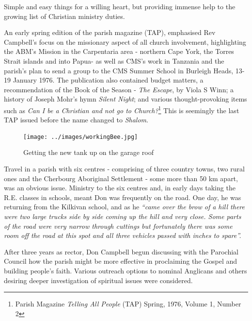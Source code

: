 Simple and easy things for a willing heart, but providing immense help to the growing list of Christian ministry duties.



An early spring edition of the parish magazine (TAP), emphasised Rev Campbell's focus on the missionary aspect of all church involvement, highlighting the ABM's Mission in the Carpentaria area - northern Cape York, the Torres Strait islands and into Papua- as well as CMS's work in Tanzania and the parish's plan to send a group to the CMS Summer School in Burleigh Heads, 13-19 January 1976. The publication also contained budget matters, a recommendation of the Book of the Season - \emph{The Escape}, by Viola S Winn; a history of Joseph Mohr's hymn \emph{Silent Night}; and various thought-provoking items such as \emph{Can I be a Christian and not go to Church?}\footnote{Parish Magazine \emph{Telling All People} (TAP) Spring, 1976, Volume 1, Number 2} This is seemingly the last TAP issued before the name changed to \emph{Shalom}.








\begin{figure}[!htb]
\begin{center}
\texttt{[image: ../images/workingBee.jpg]}
\caption{Getting the new tank up on the garage roof}
\end{center}
\end{figure}




Travel in a parish with six centres - comprising of three country towns, two rural ones and the Cherbourg Aboriginal Settlement - some more than 50 km apart, was an obvious issue. Ministry to the six centres and, in early days taking the R.E. classes in schools, meant Don was frequently on the road. One day, he was returning from the Kilkivan school, and as he \emph{``came over the brow of a hill there were two large trucks side by side coming up the hill and very close. Some parts of the road were very narrow through cuttings but fortunately there was some room off the road at this spot and all three vehicles passed with inches to spare''.}



After three years as rector, Don Campbell begun discussing with the Parochial Council how the parish might be more effective in proclaiming the Gospel and building people's faith. Various outreach options to nominal Anglicans and others desiring deeper investigation of spiritual issues were considered.




